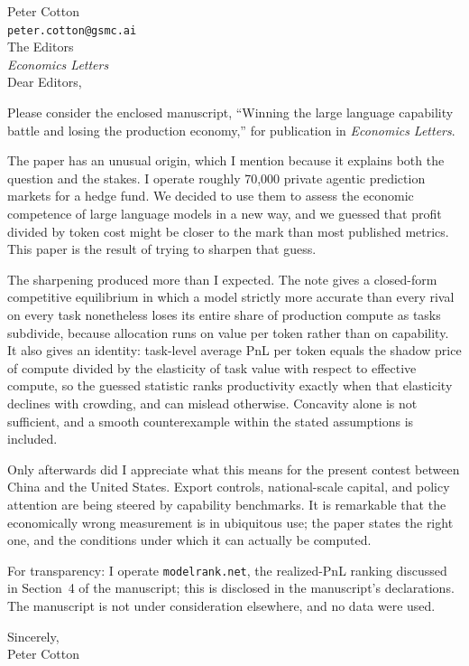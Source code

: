 \documentclass[11pt]{article}
\begin{document}
\noindent
Peter Cotton\\
\texttt{peter.cotton@gsmc.ai}\\[2em]

\noindent
The Editors\\
\emph{Economics Letters}\\[2em]

\noindent
Dear Editors,

\medskip

Please consider the enclosed manuscript, ``Winning the large language capability battle and losing the production economy,'' for publication in \emph{Economics Letters}.

The paper has an unusual origin, which I mention because it explains both the question and the stakes. I operate roughly 70,000 private agentic prediction markets for a hedge fund. We decided to use them to assess the economic competence of large language models in a new way, and we guessed that profit divided by token cost might be closer to the mark than most published metrics. This paper is the result of trying to sharpen that guess.

The sharpening produced more than I expected. The note gives a closed-form competitive equilibrium in which a model strictly more accurate than every rival on every task nonetheless loses its entire share of production compute as tasks subdivide, because allocation runs on value per token rather than on capability. It also gives an identity: task-level average PnL per token equals the shadow price of compute divided by the elasticity of task value with respect to effective compute, so the guessed statistic ranks productivity exactly when that elasticity declines with crowding, and can mislead otherwise. Concavity alone is not sufficient, and a smooth counterexample within the stated assumptions is included.

Only afterwards did I appreciate what this means for the present contest between China and the United States. Export controls, national-scale capital, and policy attention are being steered by capability benchmarks. It is remarkable that the economically wrong measurement is in ubiquitous use; the paper states the right one, and the conditions under which it can actually be computed.

For transparency: I operate \texttt{modelrank.net}, the realized-PnL ranking discussed in Section~4 of the manuscript; this is disclosed in the manuscript's declarations. The manuscript is not under consideration elsewhere, and no data were used.

\medskip

\noindent
Sincerely,\\[1em]
Peter Cotton
\end{document}
